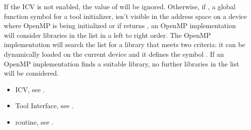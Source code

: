 If the  ICV is not enabled, 
the value of  will be ignored.
Otherwise, if , a global function symbol for a tool initializer,
isn't visible in the address space on a device where OpenMP is being
initialized or if  returns , an OpenMP implementation 
will consider libraries in the  list 
in a left to right order.  The OpenMP implementation will search the list for 
a library that meets two criteria: it can be dynamically
loaded on the current device and it defines the symbol .
If an OpenMP implementation finds a suitable library, 
no further libraries in the list will be considered.

\crossreferences
\begin{itemize}
\item {} ICV, see .
\item Tool Interface, see .
\item {} routine, see .
\end{itemize}


